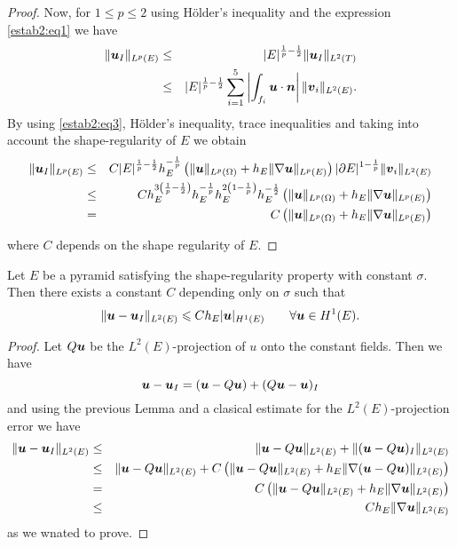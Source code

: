 \begin{proof}
Now, for $1\leqslant p\leqslant 2$ using H\"older's inequality and the expression \eqref{estab2:eq1} we have
\begin{eqnarray*}
\|\boldsymbol{u}_I\|_{L^p(E)}&\le& |E|^{\frac1p-\frac12}\|\boldsymbol{u}_I\|_{L^2(T)}\\&\le&|E|^{\frac1p-\frac12} \sum_{i=1}^5  \left|\int_{f_i}\boldsymbol{u}\cdot\boldsymbol{n}\right|\|\boldsymbol{v}_i\|_{L^2(E)}.
\end{eqnarray*}
By using \eqref{estab2:eq3}, H\"older's inequality, trace inequalities and taking into account the shape-regularity of $E$ we obtain
\begin{eqnarray*}
\|\boldsymbol{u}_I\|_{L^p(E)}&\le& C |E|^{\frac1p-\frac12} h_E^{-\frac1p}\left(\|\boldsymbol{u}\|_{L^p(\Omega)}+h_E\|\nabla\boldsymbol{u}\|_{L^p(E)}\right)|\partial E|^{1-\frac1p} \|\boldsymbol{v}_i\|_{L^2(E)}\\&\le& C h_E^{3\left(\frac1p-\frac12\right)}h_E^{-\frac1p}h_E^{2\left(1-\frac1p\right)} h_E^{-\frac12}\left(\|\boldsymbol{u}\|_{L^p(\Omega)}+h_E\|\nabla\boldsymbol{u}\|_{L^p(E)}\right)\\&=& C \left(\|\boldsymbol{u}\|_{L^p(\Omega)}+h_E\|\nabla\boldsymbol{u}\|_{L^p(E)}\right)
\end{eqnarray*}



where $C$ depends on the shape regularity of $E$.
\end{proof}

\begin{proposition}\label{propErrorInterpolacionPiramidesTetraedros}
Let $E$ be a pyramid satisfying the shape-regularity property with constant $\sigma$.
Then there exists a constant $C$ depending only on $\sigma$ such that 
\[
\|\boldsymbol{u}-\boldsymbol{u}_I\|_{L^2(E)}\leqslant C h_E|\boldsymbol{u}|_{H^1(E)} \qquad \forall \boldsymbol{u}\in H^1(E).
\]
\end{proposition}
\begin{proof} Let $Q\boldsymbol{u}$ be the $L^2(E)$-projection of $u$ onto the constant fields. Then we have
\[
\boldsymbol{u}-\boldsymbol{u}_I = (\boldsymbol{u} - Q\boldsymbol{u}) + (Q\boldsymbol{u}-\boldsymbol{u})_I
\]
and using the previous Lemma and a clasical estimate for the $L^2(E)$-projection error we have
\begin{eqnarray*}
\|\boldsymbol{u}-\boldsymbol{u}_I\|_{L^2(E)} &\le& \|\boldsymbol{u} - Q\boldsymbol{u}\|_{L^2(E)} + \|(\boldsymbol{u}-Q\boldsymbol{u})_I\|_{L^2(E)}\\ &\le& \|\boldsymbol{u} - Q\boldsymbol{u}\|_{L^2(E)} + C \left(\|\boldsymbol{u}-Q\boldsymbol{u}\|_{L^2(E)} + h_E\|\nabla(\boldsymbol{u}-Q\boldsymbol{u})\|_{L^2(E)}\right)\\ &=& C\left(\|\boldsymbol{u}-Q\boldsymbol{u}\|_{L^2(E)} + h_E\|\nabla\boldsymbol{u}\|_{L^2(E)}\right)\\&\le& Ch_E\|\nabla\boldsymbol{u}\|_{L^2(E)}
\end{eqnarray*}
as we wnated to prove.
\end{proof}


